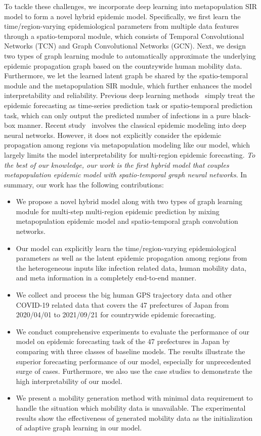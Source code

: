 \documentclass[lettersize,journal]{IEEEtran}
\begin{document}
To tackle these challenges, we incorporate deep learning into metapopulation SIR model to form a novel hybrid epidemic model. Specifically, we first learn the time/region-varying epidemiological parameters from multiple data features through a spatio-temporal module, which consists of Temporal Convolutional Networks (TCN) and Graph Convolutional Networks (GCN). Next, we design two types of graph learning module to automatically approximate the underlying epidemic propagation graph based on the countrywide human mobility data. Furthermore, we let the learned latent graph be shared by the spatio-temporal module and the metapopulation SIR module, which further enhances the model interpretability and reliability. Previous deep learning methods~\cite{ref_6,ref_7,ref_8,ref_9,ref_10} simply treat the epidemic forecasting as time-series prediction task or spatio-temporal prediction task, which can only output the predicted number of infections in a pure black-box manner. Recent study~\cite{ref_29} involves the classical epidemic modeling into deep neural networks. However, it does not explicitly consider the epidemic propagation among regions via metapopulation modeling like our model, which largely limits the model interpretability for multi-region epidemic forecasting. \emph{To the best of our knowledge, our work is the first hybrid model that couples metapopulation epidemic model with spatio-temporal graph neural networks}. In summary, our work has the following contributions:
\begin{itemize}
    \item We propose a novel hybrid model along with two types of graph learning module for multi-step multi-region epidemic prediction by mixing metapopulation epidemic model and spatio-temporal graph convolution networks.
	\item Our model can explicitly learn the time/region-varying epidemiological parameters as well as the latent epidemic propagation among regions from the heterogeneous inputs like infection related data, human mobility data, and meta information in a completely end-to-end manner. 
	\item We collect and process the big human GPS trajectory data and other COVID-19 related data that covers the 47 prefectures of Japan from 2020/04/01 to 2021/09/21 for countrywide epidemic forecasting. 
	\item We conduct comprehensive experiments to evaluate the performance of our model on epidemic forecasting task of the 47 prefectures in Japan by comparing with three classes of baseline models. The results illustrate the superior forecasting performance of our model, especially for unprecedented surge of cases. Furthermore, we also use the case studies to demonstrate the high interpretability of our model.
	\item We present a mobility generation method with minimal data requirement to handle the situation which mobility data is unavailable. The experimental results show the effectiveness of generated mobility data as the initialization of adaptive graph learning in our model. 
\end{itemize}
\end{document}
